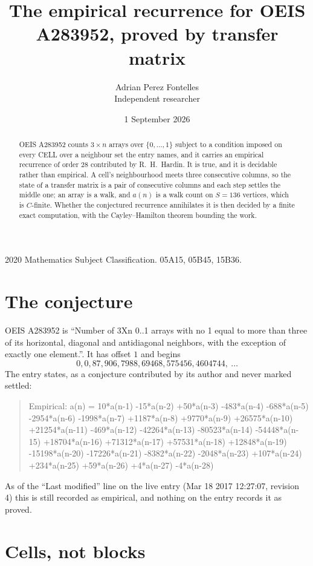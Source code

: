 \documentclass[11pt,a4paper]{article}
\title{The empirical recurrence for OEIS A283952, proved by transfer matrix}
\author{Adrian Perez Fontelles\\ \small Independent researcher}
\date{1 September 2026}
\theoremstyle{plain}
\theoremstyle{definition}
\begin{document}
\maketitle

\begin{abstract}
OEIS A283952 counts $3\times n$ arrays over $\{0,\dots,1\}$ subject to a condition imposed on
every CELL over a neighbour set the entry names, and it carries an empirical recurrence of
order $28$ contributed by R.~H.~Hardin. It is true, and it is decidable rather than
empirical. A cell's neighbourhood meets three consecutive columns, so the state of a transfer
matrix is a pair of consecutive columns and each step settles the middle one; an array is a
walk, and $a(n)$ is a walk count on $S=136$ vertices, which is $C$-finite. Whether the
conjectured recurrence annihilates it is then decided by a finite exact computation, with the
Cayley--Hamilton theorem bounding the work.
\end{abstract}

\noindent\small 2020 Mathematics Subject Classification. 05A15, 05B45, 15B36.\normalsize

\section{The conjecture}

OEIS A283952 is ``Number of 3Xn 0..1 arrays with no 1 equal to more than three of its horizontal, diagonal and antidiagonal neighbors, with the exception of exactly one element.''. It has offset $1$ and begins
\[
0, 0, 87, 906, 7988, 69468, 575456, 4604744,\ \dots
\]
The entry states, as a conjecture contributed by its author and never marked settled:
\begin{quote}
Empirical: a(n) = 10*a(n-1) -15*a(n-2) +50*a(n-3) -483*a(n-4) -688*a(n-5) -2954*a(n-6) -1998*a(n-7) +1187*a(n-8) +9770*a(n-9) +26575*a(n-10) +21254*a(n-11) -469*a(n-12) -42264*a(n-13) -80523*a(n-14) -54448*a(n-15) +18704*a(n-16) +71312*a(n-17) +57531*a(n-18) +12848*a(n-19) -15198*a(n-20) -17226*a(n-21) -8382*a(n-22) -2048*a(n-23) +107*a(n-24) +234*a(n-25) +59*a(n-26) +4*a(n-27) -4*a(n-28)
\end{quote}
As of the ``Last modified'' line on the live entry (Mar 18 2017 12:27:07, revision 4) this is still
recorded as empirical, and nothing on the entry records it as proved.

\section{Cells, not blocks}
\end{document}
